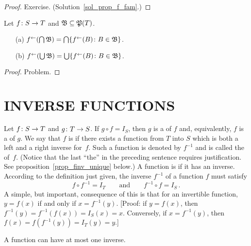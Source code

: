 \begin{proof} Exercise. (Solution~\ref{sol_prop_f_fam}.)  \ns  \end{proof}

\begin{prop}\label{prop_finv_fam}  Let $f\colon S \rightarrow T$ and $\mathfrak{B} \subseteq \mathfrak{P}(T)$.
 \begin{enumerate}
   \item[(a)] $f^\gets(\bigcap \mathfrak{B}) = \bigcap\{f^\gets(B)\colon B \in \mathfrak{B}\}$.
   \item[(b)] $f^\gets(\bigcup \mathfrak{B}) = \bigcup\{f^\gets(B)\colon B \in \mathfrak{B}\}$.
 \end{enumerate}
\end{prop}

\begin{proof} Problem.  \ns  \end{proof}








\section{INVERSE FUNCTIONS}\label{sec_inv_fcns}   Let $f\colon S \rightarrow T$
and $g\colon T \rightarrow S$.  If $g\circ f = I_S$, then $g$ is a
 of $f$ and, equivalently, $f$ is a
 of $g$. We say that  $f$ is
 if there exists a function from $T$ into  $S$ which is both a left and a right
inverse for~$f$.  Such a function is denoted by $f^{-1}$ and is called the
 of~$f$.  (Notice that the last ``the'' in the preceding sentence requires
justification.  See proposition~\ref{prop_finv_unique} below.) A function is
 if it has an inverse. According to the definition just given, the inverse
$f^{-1}$ of a function $f$ must satisfy
  \[ f \circ f^{-1} = I_T \qquad\text{and}\qquad f^{-1}\circ f = I_S\,. \]
A simple, but important, consequence of this is that for an invertible function, $y = f(x)$ if
and only if $x = f^{-1}(y)$. [Proof: if $y = f(x)$, then $f^{-1}(y) = f^{-1}(f(x)) = I_S(x) =
x$. Conversely, if $x = f^{-1}(y)$, then $f(x) = f(f^{-1}(y)) = I_T(y) = y$.]

\begin{prop}\label{prop_finv_unique}  A function can have at most one inverse.
\end{prop}

